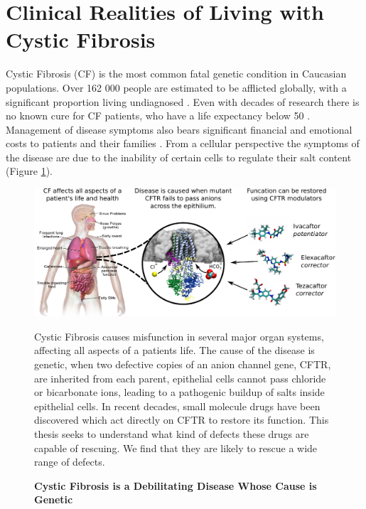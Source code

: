 

\section{Clinical Realities of Living with Cystic Fibrosis}
Cystic Fibrosis (CF) is the most common fatal genetic condition in Caucasian populations. Over 162 000 people are estimated to be afflicted globally, with a significant proportion living undiagnosed \cite{hammoudeh2021,guo2022}. Even with decades of research there is no known cure for CF patients, who have a life expectancy below 50 \cite{mcbennett2022}. Management of disease symptoms also bears significant financial and emotional costs to patients and their families \cite{vangool2013, page2022}. From a cellular perspective the symptoms of the disease are due to the inability of certain cells to regulate their salt content (Figure \ref{CF_summary}). 

\begin{figure}
	\label{CF_summary}
	\begin{center}
	\includegraphics[width=1\textwidth]{figures/cf_summary_fig.pdf}
	\end{center}
	\captionsetup{singlelinecheck = false, justification=raggedright}
	\caption[Cystic Fibrosis is a Debilitating Disease Whose Cause is Genetic] {\textbf{Cystic Fibrosis is a Debilitating Disease Whose Cause is Genetic}}{Cystic Fibrosis causes misfunction in several major organ systems, affecting all aspects of a patients life. The cause of the disease is genetic, when two defective copies of an anion channel gene, CFTR, are inherited from each parent, epithelial cells cannot pass chloride or bicarbonate ions, leading to a pathogenic buildup of salts inside epithelial cells. In recent decades, small molecule drugs have been discovered which act directly on CFTR to restore its function. This thesis seeks to understand what kind of defects these drugs are capable of rescuing. We find that they are likely to rescue a wide range of defects.} 
\end{figure}

